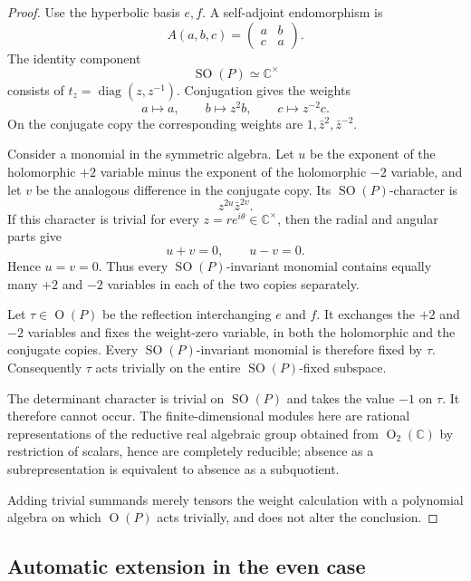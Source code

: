 \documentclass[11pt,reqno]{amsart}
\numberwithin{equation}{section}
\theoremstyle{definition}
\theoremstyle{remark}
\newcommand{\C}{\mathbb C}
\newcommand{\SO}{\operatorname{SO}}
\newcommand{\Or}{\operatorname{O}}
\newcommand{\diag}{\operatorname{diag}}
\begin{document}
\begin{proof}
Use the hyperbolic basis $e,f$.  A self-adjoint endomorphism is
\[
  A(a,b,c)=
  \begin{pmatrix}a&b\\c&a\end{pmatrix}.
\]
The identity component
\[
  \SO(P)\simeq\C^\times
\]
consists of $t_z=\diag(z,z^{-1})$.  Conjugation gives the weights
\begin{equation}\label{spin:eq:ranktwo-weights}
  a\mapsto a,
  \qquad
  b\mapsto z^2b,
  \qquad
  c\mapsto z^{-2}c.
\end{equation}
On the conjugate copy the corresponding weights are
$1,\bar z^2,\bar z^{-2}$.

Consider a monomial in the symmetric algebra.  Let $u$ be the exponent of the
holomorphic $+2$ variable minus the exponent of the holomorphic $-2$ variable,
and let $v$ be the analogous difference in the conjugate copy.  Its
$\SO(P)$-character is
\[
  z^{2u}\bar z^{2v}.
\]
If this character is trivial for every $z=re^{i\theta}\in\C^\times$, then the
radial and angular parts give
\[
  u+v=0,
  \qquad
  u-v=0.
\]
Hence $u=v=0$.  Thus every $\SO(P)$-invariant monomial contains equally many
$+2$ and $-2$ variables in each of the two copies separately.

Let $\tau\in\Or(P)$ be the reflection interchanging $e$ and $f$.  It exchanges
the $+2$ and $-2$ variables and fixes the weight-zero variable, in both the
holomorphic and the conjugate copies.  Every $\SO(P)$-invariant monomial is
therefore fixed by $\tau$.  Consequently $\tau$ acts trivially on the entire
$\SO(P)$-fixed subspace.

The determinant character is trivial on $\SO(P)$ and takes the value $-1$ on
$\tau$.  It therefore cannot occur.  The finite-dimensional modules here are
rational representations of the reductive real algebraic group obtained from
$\Or_2(\C)$ by restriction of scalars, hence are completely reducible; absence
as a subrepresentation is equivalent to absence as a subquotient.

Adding trivial summands merely tensors the weight calculation with a polynomial
algebra on which $\Or(P)$ acts trivially, and does not alter the conclusion.
\end{proof}

\subsection{Automatic extension in the even case}\label{spin:sec:automatic}
\end{document}
